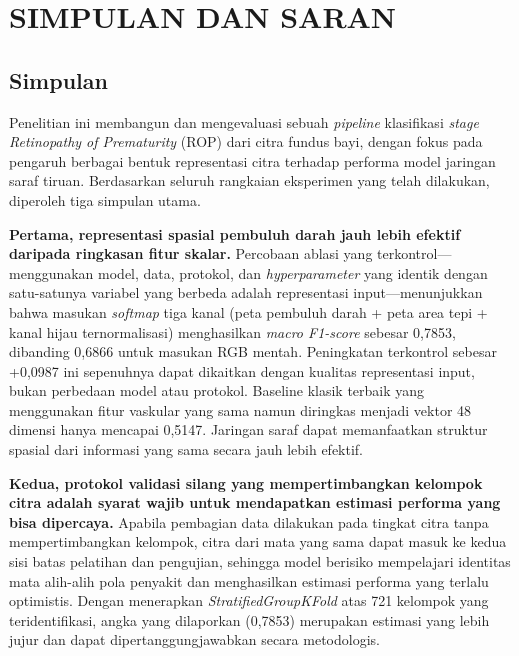 
\chapter{SIMPULAN DAN SARAN}

\section{Simpulan}

Penelitian ini membangun dan mengevaluasi sebuah \textit{pipeline} klasifikasi \textit{stage}
\textit{Retinopathy of Prematurity} (ROP) dari citra fundus bayi, dengan fokus pada pengaruh
berbagai bentuk representasi citra terhadap performa model jaringan saraf tiruan. Berdasarkan
seluruh rangkaian eksperimen yang telah dilakukan, diperoleh tiga simpulan utama.

\textbf{Pertama, representasi spasial pembuluh darah jauh lebih efektif daripada ringkasan
fitur skalar.} Percobaan ablasi yang terkontrol---menggunakan model, data, protokol, dan
\textit{hyperparameter} yang identik dengan satu-satunya variabel yang berbeda adalah
representasi input---menunjukkan bahwa masukan \textit{softmap} tiga kanal (peta pembuluh
darah + peta area tepi + kanal hijau ternormalisasi) menghasilkan \textit{macro F1-score} sebesar
0,7853, dibanding 0,6866 untuk masukan RGB mentah. Peningkatan terkontrol sebesar +0,0987 ini
sepenuhnya dapat dikaitkan dengan kualitas representasi input, bukan perbedaan model atau
protokol. Baseline klasik terbaik yang menggunakan fitur vaskular yang sama namun diringkas
menjadi vektor 48 dimensi hanya mencapai 0,5147. Jaringan saraf dapat memanfaatkan struktur
spasial dari informasi yang sama secara jauh lebih efektif.

\textbf{Kedua, protokol validasi silang yang mempertimbangkan kelompok citra adalah syarat
wajib untuk mendapatkan estimasi performa yang bisa dipercaya.} Apabila pembagian data
dilakukan pada tingkat citra tanpa mempertimbangkan kelompok, citra dari mata yang sama dapat
masuk ke kedua sisi batas pelatihan dan pengujian, sehingga model berisiko mempelajari
identitas mata alih-alih pola penyakit dan menghasilkan estimasi performa yang terlalu
optimistis. Dengan menerapkan \textit{StratifiedGroupKFold} atas 721 kelompok yang
teridentifikasi, angka yang dilaporkan (0,7853) merupakan estimasi yang lebih jujur dan dapat
dipertanggungjawabkan secara metodologis.

